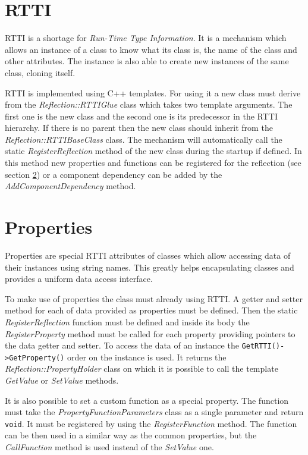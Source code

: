 \documentclass[a4paper, 12pt]{report}
\begin{document}
\section{RTTI}
\label{sec:utils-rtti}
RTTI is a shortage for \emph{Run-Time Type Information}. It is a mechanism which allows an instance of a class to know what its class is, the name of the class and other attributes. The instance is also able to create new instances of the same class, cloning itself.

RTTI is implemented using C++ templates. For using it a new class must derive from the \emph{Reflection::RTTIGlue} class which takes two template arguments. The first one is the new class and the second one is its predecessor in the RTTI hierarchy. If there is no parent then the new class should inherit from the \emph{Reflection::RTTIBaseClass} class. The mechanism will automatically call the static \emph{RegisterReflection} method of the new class during the startup if defined. In this method new properties and functions can be registered for the reflection (see section \ref{sec:utils-properties}) or a component dependency can be added by the \emph{AddComponentDependency} method.

\section{Properties}
\label{sec:utils-properties}
Properties are special RTTI attributes of classes which allow accessing data of their instances using string names. This greatly helps encapsulating classes and provides a uniform data access interface.

To make use of properties the class must already using RTTI. A getter and setter method for each of data provided as properties must be defined. Then the static \emph{RegisterReflection} function must be defined and inside its body the \emph{RegisterProperty} method must be called for each property providing pointers to the data getter and setter. To access the data of an instance the \verb/GetRTTI()->GetProperty()/ order on the instance is used. It returns the \emph{Reflection::PropertyHolder} class on which it is possible to call the template \emph{GetValue} or \emph{SetValue} methods.

It is also possible to set a custom function as a special property. The function must take the \emph{PropertyFunctionParameters} class as a single parameter and return \verb/void/. It must be registered by using the \emph{RegisterFunction} method. The function can be then used in a similar way as the common properties, but the \emph{CallFunction} method is used instead of the \emph{SetValue} one.
\end{document}
